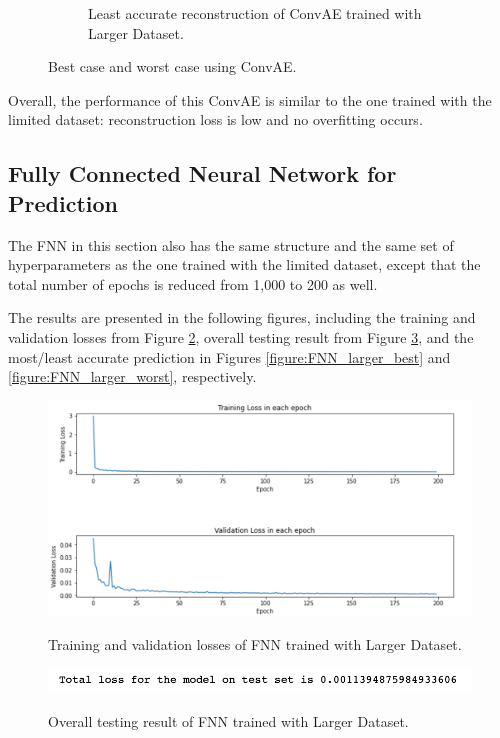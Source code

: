 \begin{figure}[H]
\begin{subfigure}{0.45\textwidth}
    \caption{Least accurate reconstruction of ConvAE trained with Larger Dataset.}
\end{subfigure}   
\caption{Best case and worst case using ConvAE.}
\label{figure:ConvAE_larger_best_worst}
\end{figure}

Overall, the performance of this ConvAE is similar to the one trained with the limited dataset: reconstruction loss is low and no overfitting occurs.


\subsection{Fully Connected Neural Network for Prediction}

The FNN in this section also has the same structure and the same set of hyperparameters as the one trained with the limited dataset, except that the total number of epochs is reduced from 1,000 to 200 as well.

The results are presented in the following figures, including the training and validation losses from Figure \ref{figure:FNN_larger_losses}, overall testing result from Figure \ref{figure:FNN_larger_testing}, and the most/least accurate prediction in Figures \ref{figure:FNN_larger_best} and \ref{figure:FNN_larger_worst}, respectively.

\begin{figure}[H]
    \caption{Training and validation losses of FNN trained with Larger Dataset.}
    \includegraphics[scale=0.6]{figures/mantle_convection_images/larger_dataset/FNN_trainingData.png}
    \label{figure:FNN_larger_losses}
\end{figure}

\begin{figure}[H]
    \caption{Overall testing result of FNN trained with Larger Dataset.}
    \includegraphics[scale=0.8]{figures/mantle_convection_images/larger_dataset/FNN_OverallTesting.png}
    \label{figure:FNN_larger_testing}
\end{figure}

